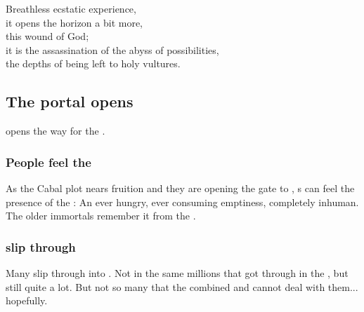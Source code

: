 \begin{garbage}
{  Breathless ecstatic experience,\\
  it opens the horizon a bit more,\\
  this wound of God;\\
  it is the assassination of the abyss of possibilities, \\
  the depths of being left to holy vultures. 
}






\subsection{The portal opens}
\Lithrim{} opens the way for the \Voidbringer. 






\subsubsection{People feel the \Voidbringer}
As the Cabal plot nears fruition and they are opening the gate to \Erebos, \Miithian s can feel the presence of the \Voidbringer: 
An ever hungry, ever consuming emptiness, completely inhuman. 
The older immortals remember it from the \secondbanewar. 





\subsubsection{\Banes{} slip through}
Many \lesserbanes{} slip through into \Miith. 
Not in the same millions that got through in the \secondbanewar, but still quite a lot. 
But not so many that the combined \dragons{} and \resphain{} cannot deal with them... hopefully. 


















\end{garbage}
